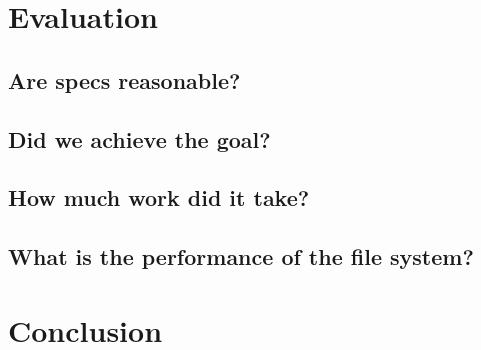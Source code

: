 \documentclass[onecolumn]{paper}
\begin{document}
		
		
		
\newpage
\section{Evaluation}
        \subsection{Are specs reasonable?}
	\subsection{Did we achieve the goal?}
	\subsection{How much work did it take?}
	\subsection{What is the performance of the file system?}

\section{Conclusion}
\end{document}
